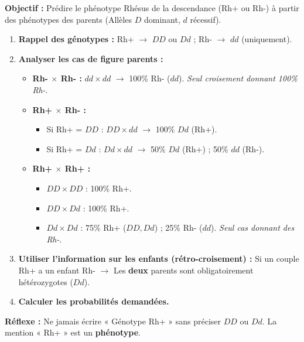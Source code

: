 \documentclass[11pt]{article}
\begin{document}
\begin{methode}
    \textbf{Objectif :} Prédire le phénotype Rhésus de la descendance (Rh+ ou Rh-) à partir des phénotypes des parents (Allèles $D$ dominant, $d$ récessif).
    \begin{enumerate}
        \item \textbf{Rappel des génotypes :} Rh+ $\rightarrow$ $DD$ ou $Dd$ ; Rh- $\rightarrow$ $dd$ (uniquement).
        \item \textbf{Analyser les cas de figure parents :}
        \begin{itemize}
            \item \textbf{Rh- $\times$ Rh- :} $dd \times dd$ $\rightarrow$ 100\% Rh- ($dd$). \emph{Seul croisement donnant 100\% Rh-}.
            \item \textbf{Rh+ $\times$ Rh- :} 
                \begin{itemize}
                    \item Si Rh+ = $DD$ : $DD \times dd$ $\rightarrow$ 100\% $Dd$ (Rh+).
                    \item Si Rh+ = $Dd$ : $Dd \times dd$ $\rightarrow$ 50\% $Dd$ (Rh+) ; 50\% $dd$ (Rh-).
                \end{itemize}
            \item \textbf{Rh+ $\times$ Rh+ :} 
                \begin{itemize}
                    \item $DD \times DD$ : 100\% Rh+.
                    \item $DD \times Dd$ : 100\% Rh+.
                    \item $Dd \times Dd$ : 75\% Rh+ ($DD, Dd$) ; 25\% Rh- ($dd$). \emph{Seul cas donnant des Rh-}.
                \end{itemize}
        \end{itemize}
        \item \textbf{Utiliser l'information sur les enfants (rétro-croisement) :} Si un couple Rh+ a un enfant Rh- $\rightarrow$ Les \textbf{deux} parents sont obligatoirement hétérozygotes ($Dd$).
        \item \textbf{Calculer les probabilités demandées.}
    \end{enumerate}
    \textbf{Réflexe :} Ne jamais écrire « Génotype Rh+ » sans préciser $DD$ ou $Dd$. La mention « Rh+ » est un \textbf{phénotype}.
\end{methode}
\end{document}
